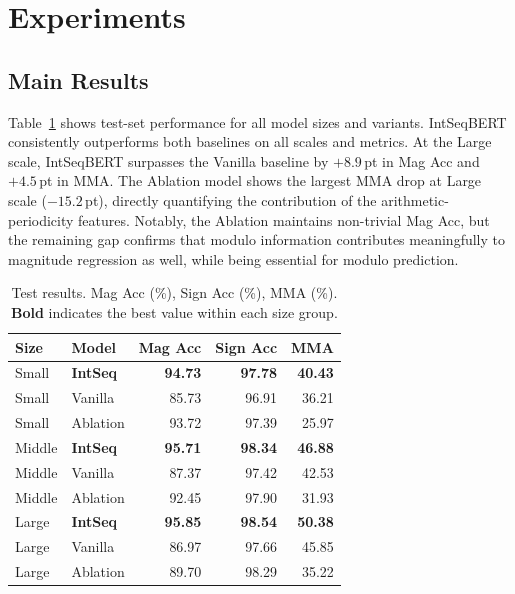 
\section{Experiments}
\label{sec:experiments}

\subsection{Main Results}
\label{sec:main-results}

Table~\ref{tab:main} shows test-set performance for all model sizes and variants. IntSeqBERT
consistently outperforms both baselines on all scales and metrics. At the Large scale,
IntSeqBERT surpasses the Vanilla baseline by $+8.9$\,pt in Mag Acc and $+4.5$\,pt in MMA.
The Ablation model shows the largest MMA drop at Large scale ($-15.2$\,pt), directly
quantifying the contribution of the arithmetic-periodicity features. Notably, the Ablation
maintains non-trivial Mag Acc, but the remaining gap confirms that modulo information contributes
meaningfully to magnitude regression as well, while being essential for modulo prediction.

\begin{table}[htbp]
\caption{Test results. Mag Acc (\%), Sign Acc (\%), MMA (\%). \textbf{Bold} indicates the best value within each size group.}
\label{tab:main}
\centering
\begin{tabular}{llrrr}
\hline
Size   & Model          & Mag Acc        & Sign Acc       & MMA            \\
\hline
Small  & \textbf{IntSeq}& \textbf{94.73} & \textbf{97.78} & \textbf{40.43} \\
Small  & Vanilla        & 85.73          & 96.91          & 36.21          \\
Small  & Ablation       & 93.72          & 97.39          & 25.97          \\
Middle & \textbf{IntSeq}& \textbf{95.71} & \textbf{98.34} & \textbf{46.88} \\
Middle & Vanilla        & 87.37          & 97.42          & 42.53          \\
Middle & Ablation       & 92.45          & 97.90          & 31.93          \\
Large  & \textbf{IntSeq}& \textbf{95.85} & \textbf{98.54} & \textbf{50.38} \\
Large  & Vanilla        & 86.97          & 97.66          & 45.85          \\
Large  & Ablation       & 89.70          & 98.29          & 35.22          \\
\hline
\end{tabular}
\end{table}

